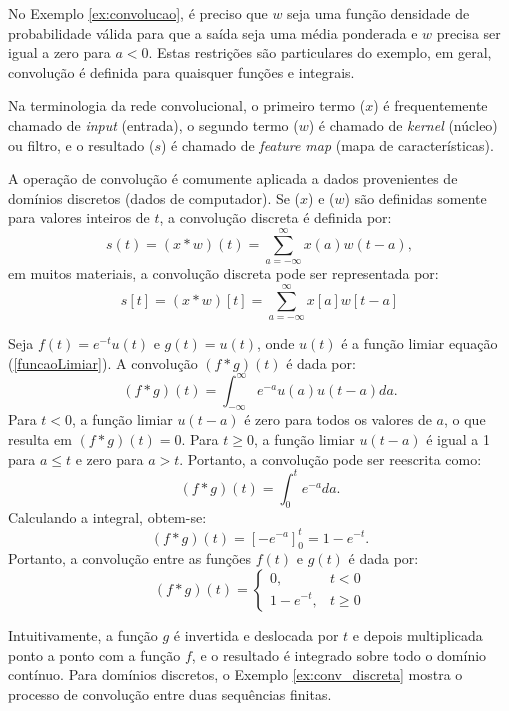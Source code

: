 No Exemplo \ref{ex:convolucao}, é preciso que $w$ seja uma função densidade de probabilidade válida para que a saída seja uma média ponderada e $w$ precisa ser igual a zero para $a < 0$. Estas restrições são particulares do exemplo, em geral, convolução é definida para quaisquer funções e integrais. 

Na terminologia da rede convolucional, o primeiro termo ($x$) é frequentemente chamado de \textit{input} (entrada), o segundo termo ($w$) é chamado de \textit{kernel} (núcleo) ou filtro, e o resultado ($s$) é chamado de \textit{feature map} (mapa de características).



A operação de convolução é comumente aplicada a dados provenientes de domínios discretos (dados de computador). Se ($x$) e ($w$) são definidas somente para valores inteiros de $t$, a convolução discreta é definida por:
\begin{equation}
    s(t) = (x*w)(t) = \sum_{a=-\infty}^{\infty} x(a)w(t-a),
\end{equation}
em muitos materiais, a convolução discreta pode ser representada por:
$$
s[t] = (x*w)[t] = \sum_{a=-\infty}^{\infty} x[a]w[t-a]
$$
\begin{exemplo}
    Seja $f(t) = e^{-t}u(t)$ e $g(t) = u(t)$, onde $u(t)$ é a função limiar equação (\ref{funcaoLimiar}). A convolução $(f*g)(t)$ é dada por:
    $$
    (f*g)(t) = \int_{-\infty}^{\infty} e^{-a}u(a)u(t-a)da.
    $$
Para $t < 0$, a função limiar $u(t-a)$ é zero para todos os valores de $a$, o que resulta em $(f*g)(t) = 0$. Para $t \geq 0$, a função limiar $u(t-a)$ é igual a 1 para $a \leq t$ e zero para $a > t$. Portanto, a convolução pode ser reescrita como:
$$
(f*g)(t) = \int_{0}^{t} e^{-a} da.
$$
Calculando a integral, obtem-se:
$$
(f*g)(t) = \left[-e^{-a}\right]_{0}^{t} = 1 - e^{-t}.
$$
Portanto, a convolução entre as funções $f(t)$ e $g(t)$ é dada por:
\begin{equation}
    (f*g)(t) = \begin{cases}
    0, & t < 0 \\
    1 - e^{-t}, & t \geq 0
    \end{cases}
\end{equation}

\end{exemplo}
Intuitivamente, a função $g$ é invertida e deslocada por $t$ e depois multiplicada ponto a ponto com a função $f$, e o resultado é integrado sobre todo o domínio contínuo. Para domínios discretos, o Exemplo \ref{ex:conv_discreta} mostra o processo de convolução entre duas sequências finitas. 

